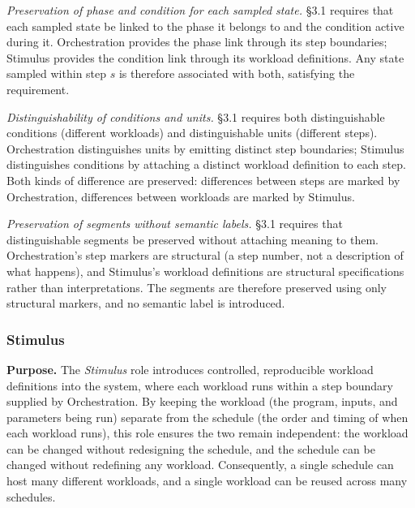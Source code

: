   \emph{Preservation of phase and condition for each sampled state.} \S3.1 requires that each sampled state be linked to the phase it belongs to and the condition active during it. Orchestration provides the phase link through its step boundaries; Stimulus provides the condition link through its workload definitions. Any state sampled within step $s$ is therefore associated with both, satisfying the requirement.

  \emph{Distinguishability of conditions and units.} \S3.1 requires both distinguishable conditions (different workloads) and distinguishable units (different steps). Orchestration distinguishes units by emitting distinct step boundaries; Stimulus distinguishes conditions by attaching a distinct workload definition to each step. Both kinds of difference are preserved: differences between steps are marked by Orchestration, differences between workloads are marked by Stimulus.

  \emph{Preservation of segments without semantic labels.} \S3.1 requires that distinguishable segments be preserved without attaching meaning to them. Orchestration's step markers are structural (a step number, not a description of what happens), and Stimulus's workload definitions are structural specifications rather than interpretations. The segments are therefore preserved using only structural markers, and no semantic label is introduced.

  \subsubsection{Stimulus}\label{subsubsec:stimulus}
  \textbf{Purpose.} The \emph{Stimulus} role introduces controlled, reproducible workload definitions into the system, where each workload runs within a step boundary supplied by Orchestration. By keeping the workload (the program, inputs, and parameters being run) separate from the schedule (the order and timing of when each workload runs), this role ensures the two remain independent: the workload can be changed without redesigning the schedule, and the schedule can be changed without redefining any workload. Consequently, a single schedule can host many different workloads, and a single workload can be reused across many schedules.


